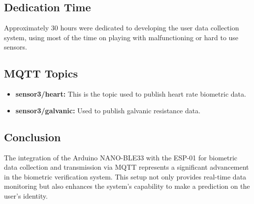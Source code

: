\documentclass{article}
\begin{document}
\subsection{Dedication Time}
Approximately 30 hours were dedicated to developing the user data collection system, using most of the time on playing with malfunctioning or hard to use sensors.

\subsection{MQTT Topics}
\begin{itemize}
    \item \textbf{sensor3/heart:} This is the topic used to publish heart rate biometric data.
    \item \textbf{sensor3/galvanic:} Used to publish galvanic resistance data.
\end{itemize}

\subsection{Conclusion}
The integration of the Arduino NANO-BLE33 with the ESP-01 for biometric data collection and transmission via MQTT represents a significant advancement in the biometric verification system. This setup not only provides real-time data monitoring but also enhances the system's capability to make a prediction on the user's identity.
\end{document}
